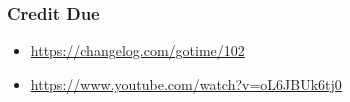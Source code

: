
\begin{frame}
  \frametitle{Credit Due}
  \centering
  \begin{itemize}
    \item \url{https://changelog.com/gotime/102}
    \item \url{https://www.youtube.com/watch?v=oL6JBUk6tj0}
  \end{itemize}
\end{frame}
